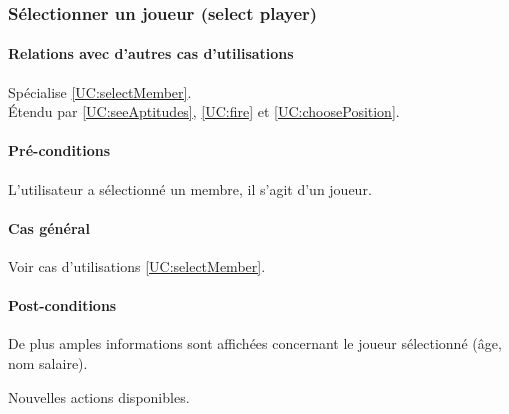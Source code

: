 
\subsubsection{Sélectionner un joueur (select player)}
\label{UC:selectPlayer}
\paragraph{Relations avec d'autres cas d'utilisations}
Spécialise \ref{UC:selectMember}.\\
Étendu par \ref{UC:seeAptitudes}, \ref{UC:fire} et \ref{UC:choosePosition}. 
\paragraph{Pré-conditions}
\begin{list}{}{\leftmargin=1.5em}
\item{L'utilisateur a sélectionné un membre, il s'agit d'un joueur.}
\end{list}
\paragraph{Cas général}
Voir cas d'utilisations \ref{UC:selectMember}.
\paragraph{Post-conditions}
\begin{list}{}{\leftmargin=1.5em}
\item{De plus amples informations sont affichées concernant le joueur sélectionné (âge, nom salaire).}
\item{Nouvelles actions disponibles.}
\end{list}

